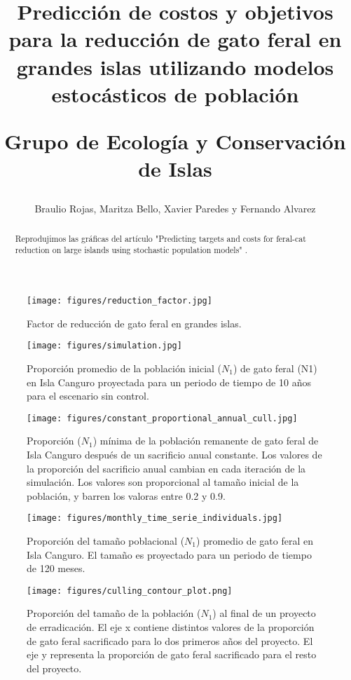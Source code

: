 \documentclass{article} %
\author{Braulio Rojas, Maritza Bello, Xavier Paredes y Fernando Alvarez}
\title{Predicción de costos y objetivos para la reducción de gato feral en grandes islas utilizando
modelos estocásticos de población \\ \begin{large} Grupo de Ecología y Conservación de Islas
\end{large}}
\begin{document}
\maketitle

\begin{abstract}

Reprodujimos las gráficas del artículo "Predicting targets and costs for feral-cat reduction on
large islands using stochastic population models" \cite{venning2021predicting}.

\end{abstract}


\begin{figure}[H]
    \centering
\texttt{[image: figures/reduction\_factor.jpg]}
\caption{Factor de reducción de gato feral en grandes islas.}
\label{fig:reductionFactor}
\end{figure}

\begin{figure}[H]
    \centering
\texttt{[image: figures/simulation.jpg]}
\caption{Proporción promedio de la población inicial ($N_1$) de gato feral (N1) en Isla Canguro proyectada para
un periodo de tiempo de 10 años para el escenario sin control.}
\label{fig:simulation}
\end{figure}

\begin{figure}[H]
    \centering
\texttt{[image: figures/constant\_proportional\_annual\_cull.jpg]}
\caption{Proporción ($N_1$) mínima de la población remanente de gato feral de Isla Canguro después de
	un sacrificio anual constante. Los valores de la proporción del sacrificio anual cambian en cada
    iteración de la simulación. Los valores son proporcional al tamaño inicial de la población, y 
    barren los valoras entre 0.2 y 0.9.}
\label{fig:constantProportionalAnnualCull}
\end{figure}

\begin{figure}[H]
    \centering
\texttt{[image: figures/monthly\_time\_serie\_individuals.jpg]}
\caption{Proporción del tamaño poblacional ($N_1$) promedio de gato feral en Isla Canguro. El tamaño
es proyectado para un periodo de tiempo de 120 meses.}
\label{fig:monthlyTimeSerieIndividuals}
\end{figure}

\begin{figure}[H]
\centering
\texttt{[image: figures/culling\_contour\_plot.png]}
\caption{Proporción del tamaño de la población ($N_1$) al final de un proyecto de erradicación. El
eje x contiene distintos valores de la proporción de gato feral sacrificado para lo dos primeros
años del proyecto. El eje y representa la proporción de gato feral sacrificado para el resto del
proyecto.}
\label{fig:culling_contour_plot}
\end{figure}
\end{document}
